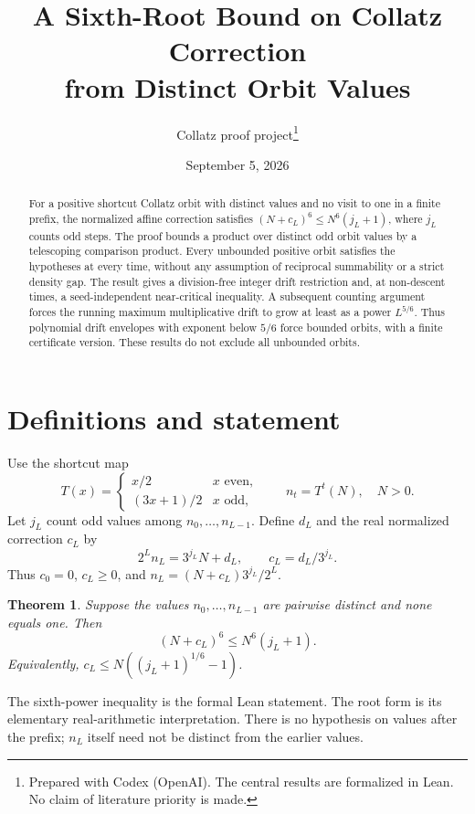 \documentclass[11pt]{article}
\title{A Sixth-Root Bound on Collatz Correction\\from Distinct Orbit Values}
\author{Collatz proof project\thanks{Prepared with Codex (OpenAI). The central results are formalized in Lean. No claim of literature priority is made.}}
\date{September 5, 2026}
\newtheorem{theorem}{Theorem}
\begin{document}
\maketitle
\begin{abstract}
For a positive shortcut Collatz orbit with distinct values and no visit to one in a finite prefix, the normalized affine correction satisfies $(N+c_L)^6\le N^6(j_L+1)$, where $j_L$ counts odd steps. The proof bounds a product over distinct odd orbit values by a telescoping comparison product. Every unbounded positive orbit satisfies the hypotheses at every time, without any assumption of reciprocal summability or a strict density gap. The result gives a division-free integer drift restriction and, at non-descent times, a seed-independent near-critical inequality. A subsequent counting argument forces the running maximum multiplicative drift to grow at least as a power $L^{5/6}$. Thus polynomial drift envelopes with exponent below $5/6$ force bounded orbits, with a finite certificate version. These results do not exclude all unbounded orbits.
\end{abstract}

\section{Definitions and statement}
Use the shortcut map
\[
T(x)=\begin{cases}x/2&x\text{ even},\\(3x+1)/2&x\text{ odd},\end{cases}
\qquad n_t=T^t(N),\quad N>0.
\]
Let $j_L$ count odd values among $n_0,\ldots,n_{L-1}$. Define $d_L$ and the real normalized correction $c_L$ by
\[
2^L n_L=3^{j_L}N+d_L,\qquad c_L=d_L/3^{j_L}.
\]
Thus $c_0=0$, $c_L\ge0$, and $n_L=(N+c_L)3^{j_L}/2^L$.

\begin{theorem}\label{thm:finite}
Suppose the values $n_0,\ldots,n_{L-1}$ are pairwise distinct and none equals one. Then
\begin{equation}\label{eq:main}
(N+c_L)^6\le N^6(j_L+1).
\end{equation}
Equivalently, $c_L\le N((j_L+1)^{1/6}-1)$.
\end{theorem}
The sixth-power inequality is the formal Lean statement. The root form is its elementary real-arithmetic interpretation. There is no hypothesis on values after the prefix; $n_L$ itself need not be distinct from the earlier values.

\newpage
\end{document}
